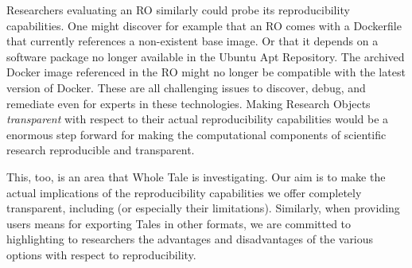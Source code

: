 Researchers evaluating an RO similarly could probe its reproducibility capabilities.  One might discover for example
	that an RO comes with a Dockerfile that currently references a non-existent base image.  
Or that it depends on a software package no longer available in the Ubuntu Apt Repository.  
The archived Docker image referenced in the RO might no longer be compatible with the latest version of Docker.  
These are all challenging issues to discover, debug, and remediate even for experts in these technologies.
Making Research Objects \emph{transparent} with respect to their actual reproducibility capabilities would be a
	enormous step forward for making the computational components of scientific research reproducible and
	transparent.

This, too, is an area that Whole Tale is investigating.  Our aim is to make the actual implications of the
	reproducibility capabilities we offer completely transparent, including (or especially their limitations).
Similarly, when providing users means for exporting Tales in other formats, we are committed to highlighting
	to researchers the advantages and disadvantages of the various options with respect to reproducibility.
	

